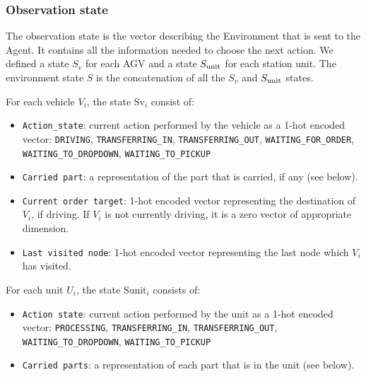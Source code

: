 \documentclass[sn-mathphys]{sn-jnl}
\begin{document}
\subsubsection{Observation state}

The observation state is the vector describing the Environment that is sent to the Agent. It contains all the information needed to choose the next action. We defined a state $S_v$ for each AGV and a state $S_{\rm unit}$ for each station unit. The environment state $S$ is the concatenation of all the $S_v$ and $S_{\rm unit}$ states.

For each vehicle $V_i$, the state $\text{Sv}_i$ consist of:
\begin{itemize}
    \item \texttt{Action\_state}: current action performed by the vehicle as a 1-hot encoded vector: \texttt{DRIVING}, \texttt{TRANSFERRING\_IN}, \texttt{TRANSFERRING\_OUT}, \texttt{WAITING\_FOR\_ORDER}, \texttt{WAITING\_TO\_DROPDOWN}, \texttt{WAITING\_TO\_PICKUP}
    \item \texttt{Carried part}: a representation of the part that is carried, if any (see below).
    \item \texttt{Current order target}: 1-hot encoded vector representing the destination of $V_i$, if driving. If $V_i$ is not currently driving, it is a zero vector of appropriate dimension.
    \item \texttt{Last visited node}: 1-hot encoded vector representing the last node which $V_i$ has visited.
\end{itemize}

\noindent For each unit $U_i$, the state $\text{Sunit}_i$ consists of:
\begin{itemize}
    \item \texttt{Action state}: current action performed by the unit as a 1-hot encoded vector: \texttt{PROCESSING}, \texttt{TRANSFERRING\_IN}, \texttt{TRANSFERRING\_OUT}, \texttt{WAITING\_TO\_DROPDOWN}, \texttt{WAITING\_TO\_PICKUP}
    \item \texttt{Carried parts}: a representation of each part that is in the unit (see below).
\end{itemize}
\end{document}
